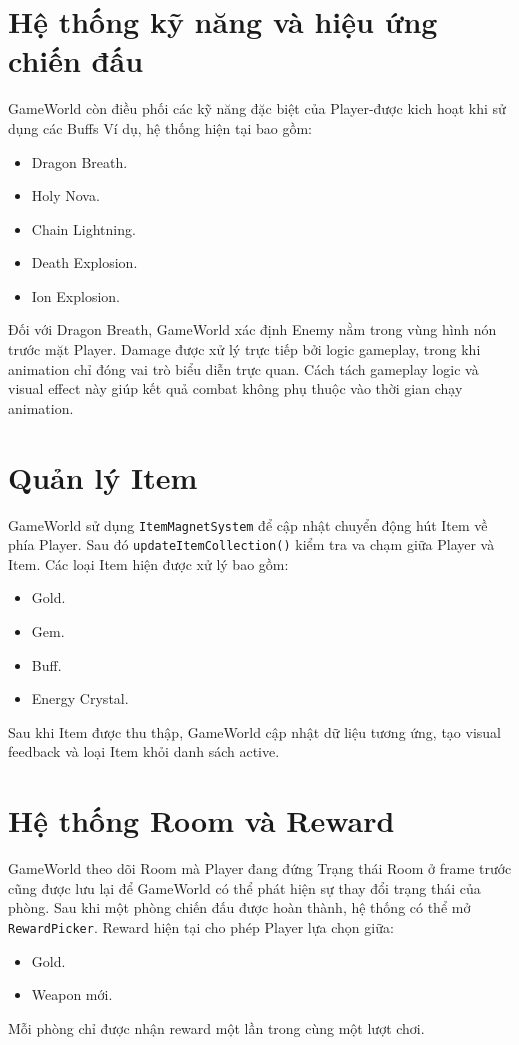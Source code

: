 \documentclass[12pt,a4paper]{report}
\begin{document}
    \section{Hệ thống kỹ năng và hiệu ứng chiến đấu}
    GameWorld còn điều phối các kỹ năng đặc biệt của Player-được kich hoạt khi sử dụng các Buffs
    Ví dụ, hệ thống hiện tại bao gồm:
    \begin{itemize}
        \item Dragon Breath.
        \item Holy Nova.
        \item Chain Lightning.
        \item Death Explosion.
        \item Ion Explosion.
    \end{itemize}
    Đối với Dragon Breath, GameWorld xác định Enemy nằm trong vùng
    hình nón trước mặt Player. Damage được xử lý trực tiếp bởi logic
    gameplay, trong khi animation chỉ đóng vai trò biểu diễn trực
    quan.
    Cách tách gameplay logic và visual effect này giúp kết quả combat
    không phụ thuộc vào thời gian chạy animation.


    \section{Quản lý Item}
    GameWorld sử dụng \texttt{ItemMagnetSystem} để cập nhật chuyển
    động hút Item về phía Player.
    Sau đó \texttt{updateItemCollection()} kiểm tra va chạm giữa
    Player và Item.
    Các loại Item hiện được xử lý bao gồm:
    \begin{itemize}
        \item Gold.
        \item Gem.
        \item Buff.
        \item Energy Crystal.
    \end{itemize}
    Sau khi Item được thu thập, GameWorld cập nhật dữ liệu tương ứng,
    tạo visual feedback và loại Item khỏi danh sách active.


    \section{Hệ thống Room và Reward}
    GameWorld theo dõi Room mà Player đang đứng
    Trạng thái Room ở frame trước cũng được lưu lại để GameWorld có
    thể phát hiện sự thay đổi trạng thái của phòng.
    Sau khi một phòng chiến đấu được hoàn thành, hệ thống có thể mở
    \texttt{RewardPicker}.
    Reward hiện tại cho phép Player lựa chọn giữa:
    \begin{itemize}
        \item Gold.
        \item Weapon mới.
    \end{itemize}
    Mỗi phòng chỉ được nhận reward một lần trong cùng một lượt chơi.
\end{document}

